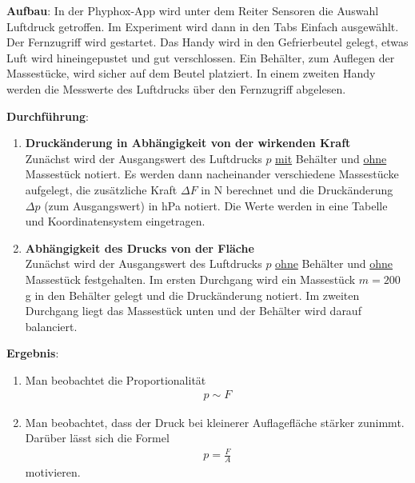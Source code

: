 \documentclass[../main.tex]{subfiles}
\begin{document}
\begin{tcolorbox}
    \vspace{0.5cm}
    \textbf{Aufbau}: In der Phyphox-App wird unter dem Reiter \glqq Sensoren\grqq{} die Auswahl \glqq Luftdruck\grqq{} getroffen. Im Experiment wird dann in den Tabs \glqq Einfach\grqq{} ausgewählt. Der Fernzugriff wird gestartet. Das Handy wird in den Gefrierbeutel gelegt, etwas Luft wird hineingepustet und gut verschlossen. Ein Behälter, zum Auflegen der Massestücke, wird sicher auf dem Beutel platziert. In einem zweiten Handy werden die Messwerte des Luftdrucks über den Fernzugriff abgelesen.  

    \vspace{0.5cm}
    \textbf{Durchführung}: 
    \begin{enumerate}
        \item \textbf{Druckänderung in Abhängigkeit von der wirkenden Kraft} \\
            Zunächst wird der Ausgangswert des Luftdrucks $p$ \underline{mit} Behälter und \underline{ohne} Massestück notiert. Es werden dann nacheinander verschiedene Massestücke aufgelegt, die zusätzliche Kraft $\Delta F$ in N berechnet und die Druckänderung $\Delta p$ (zum Ausgangswert) in hPa notiert. Die Werte werden in eine Tabelle und Koordinatensystem eingetragen.
        \item \textbf{Abhängigkeit des Drucks von der Fläche}\\
            Zunächst wird der Ausgangswert des Luftdrucks $p$ \underline{ohne} Behälter und \underline{ohne} Massestück festgehalten. Im ersten Durchgang wird ein Massestück $m=200$ g in den Behälter gelegt und die Druckänderung notiert. Im zweiten Durchgang liegt das Massestück unten und der Behälter wird darauf balanciert.  

    \end{enumerate}

    \vspace{0.5cm}
    \textbf{Ergebnis}: 
    \begin{enumerate}
        \item Man beobachtet die Proportionalität
            \begin{align*}
                p \sim F
            \end{align*}
        \item Man beobachtet, dass der Druck bei kleinerer Auflagefläche stärker zunimmt. Darüber lässt sich die Formel
            \begin{align*}
                p = \frac{F}{A}
            \end{align*}
            motivieren.
    \end{enumerate}

\end{tcolorbox}
\end{document}
